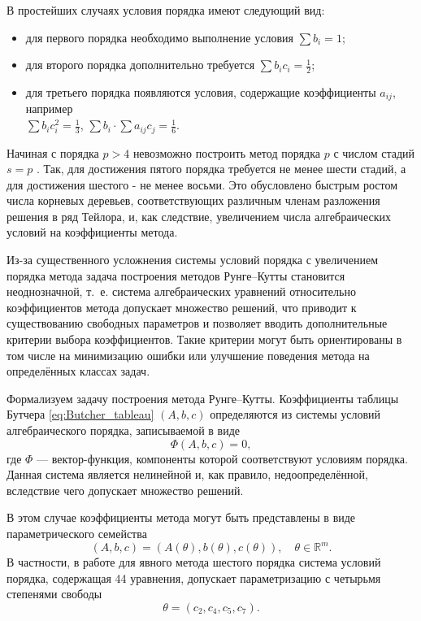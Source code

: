 В простейших случаях условия порядка имеют следующий вид:
\begin{itemize}
	\item для первого порядка необходимо выполнение условия $\sum b_i = 1$; 
	\item для второго порядка дополнительно требуется $\sum b_i c_i = \frac{1}{2}$;
	\item для третьего порядка появляются условия, содержащие коэффициенты $a_{ij}$, например \\
	$\sum b_i c_i^2 = \frac{1}{3}$, $\sum b_i \cdot \sum a_{ij}c_j = \frac{1}{6}$. 
\end{itemize}

Начиная с порядка $p > 4$ невозможно построить метод порядка $p$ с числом стадий $s = p$ \cite{Butcher2008}. Так, для достижения пятого порядка требуется не менее шести стадий, а для достижения шестого - не менее восьми. Это обусловлено быстрым ростом числа корневых деревьев, соответствующих различным членам разложения решения в ряд Тейлора, и, как следствие, увеличением числа алгебраических условий на коэффициенты метода.

Из-за существенного усложнения системы условий порядка с увеличением порядка метода задача построения методов Рунге--Кутты становится неоднозначной, т.~е. система алгебраических уравнений относительно коэффициентов метода допускает множество решений, что приводит к существованию свободных параметров и позволяет вводить дополнительные критерии выбора коэффициентов. Такие критерии могут быть ориентированы в том числе на минимизацию ошибки или улучшение поведения метода на определённых классах задач.

Формализуем задачу построения метода Рунге--Кутты. Коэффициенты таблицы Бутчера \eqref{eq:Butcher_tableau} $(A, b, c)$  определяются из системы условий алгебраического порядка, записываемой в виде
\begin{equation*}
	\Phi(A, b, c) = 0,
\end{equation*}
где $\Phi$ — вектор-функция, компоненты которой соответствуют условиям порядка. Данная система является нелинейной и, как правило, недоопределённой, вследствие чего допускает множество решений.

В этом случае коэффициенты метода могут быть представлены в виде параметрического семейства
\begin{equation*} 
	(A, b, c) = (A(\theta), b(\theta), c(\theta)), \quad \theta \in \mathbb{R}^m.
\end{equation*}
В частности, в работе \cite{Anastassi2023} для явного метода шестого порядка система условий порядка, содержащая 44 уравнения, допускает параметризацию с четырьмя степенями свободы
\begin{equation} \label{eq:theta}
	\theta = (c_2, c_4, c_5, c_7).
\end{equation}

